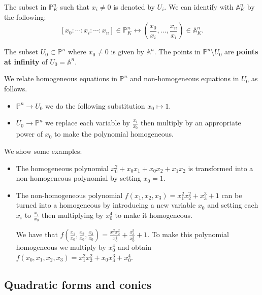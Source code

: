 \documentclass[12pt, a4paper]{article}
\renewcommand{\AA}{\mathbb A}
\newcommand{\PP}{\mathbb P}
\begin{document}
\begin{definition}
    The subset in \(\PP^n_K\) such that \(x_i \neq 0\) is denoted by \(U_i\). We can identify with \(\AA^n_K\) by the following: 
    \[[x_0:\cdots:x_i:\cdots:x_n] \in \PP^n_K \longleftrightarrow \left( \frac{x_0}{x_i},\ldots,\frac{x_n}{x_i} \right) \in \AA^n_K.\]
\end{definition}

\begin{definition}
    The subset \(U_0 \subset \PP^n\) where \(x_0 \neq 0\) is given by \(\AA^n\). The points in \(\PP^n\setminus U_0\) are \textbf{points at infinity} of \(U_0 = \AA^n\). 
\end{definition}

\begin{mdcor}
    We relate homogeneous equations in \(\PP^n\) and non-homogeneous equations in \(U_0\) as follows.
    \begin{itemize}
        \item \(\PP^n \to U_0\) we do the following substitution \(x_0 \mapsto 1\).
        \item \(U_0 \to \PP^n\) we replace each variable by \(\frac{x_i}{x_0}\) then multiply by an appropriate power of \(x_0\) to make the polynomial homogeneous.
    \end{itemize}
\end{mdcor}

\begin{mdexample}
    We show some examples:
    \begin{itemize}
        \item The homogeneous polynomial \(x^2_0+x_0x_1+x_0x_2+x_1x_2\) is transformed into a non-homogeneous polynomial by setting \(x_0 =1\).
        \item The non-homogeneous polynomial \(f(x_1,x_2,x_3)=x_1^2x_2^2+x_3^3+1\) can be turned into a homogeneous by introducing a new variable \(x_0\) and setting each \(x_i\) to \(\frac{x_i}{x_0}\) then multiplying by \(x_0^4\) to make it homogeneous. 
        
        We have that \(f\left(\frac{x_1}{x_0},\frac{x_2}{x_0},\frac{x_3}{x_0} \right) = \frac{x_1^2x_2^2}{x_0^4}+\frac{x_3^3}{x_0^3}+1\). To make this polynomial homogeneous we multiply by \(x_0^4\) and obtain \(f(x_0,x_1,x_2,x_3)=x_1^2x_2^2+x_0x^3_3+x_0^4\).
    \end{itemize}
\end{mdexample}

\subsection{Quadratic forms and conics}
\end{document}
